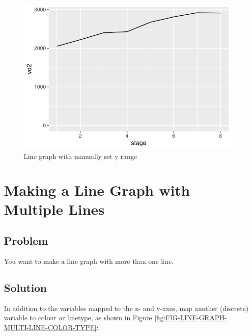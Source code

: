 \documentclass[
]{book}
\begin{document}
\begin{figure}

{\centering \includegraphics[width=0.5\linewidth]{se201_stats_book_files/figure-latex/FIG-LINE-GRAPH-BASIC-LINE-YLIM-1} 

}

\caption[Line graph with manually set y range]{Line graph with manually set y range}\label{fig:FIG-LINE-GRAPH-BASIC-LINE-YLIM}
\end{figure}

\hypertarget{LINE-GRAPH-MULTIPLE-LINE}{%
\section{Making a Line Graph with Multiple Lines}\label{LINE-GRAPH-MULTIPLE-LINE}}

\hypertarget{problem-23}{%
\subsection{Problem}\label{problem-23}}

You want to make a line graph with more than one line.

\hypertarget{solution-23}{%
\subsection{Solution}\label{solution-23}}

In addition to the variables mapped to the x- and y-axes, map another (discrete) variable to colour or linetype, as shown in Figure \ref{fig:FIG-LINE-GRAPH-MULTI-LINE-COLOR-TYPE}:
\end{document}
